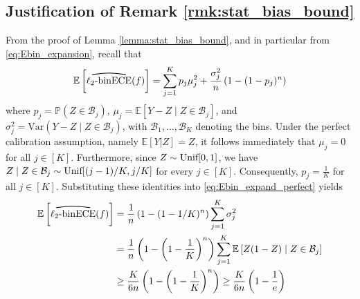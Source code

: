 \documentclass[11pt]{article}
\numberwithin{equation}{section}
\theoremstyle{definition}
\newcommand{\E}{\mathbb{E}}
\renewcommand{\P}{\mathbb{P}}
\newcommand{\cB}{\mathcal{B}}
\newcommand{\myoverline}[2][3.5em]{%
  \overset{%
    \tikz[baseline=-0.1ex]{
      \draw[line width=0.75pt]
        (0,0) .. controls (#1/2,0.5ex) .. (#1,0);
    }%
  }{#2}%
}
\newcommand{\Var}{\mathrm{Var}}
\newcommand{\binECE}{\mathrm{binECE}}
\newcommand{\lbinECE}{\ell_2\textnormal{-}\binECE}
\newcommand{\binhatECE}{\myoverline{\lbinECE}}
\begin{document}
\subsection{Justification of Remark \ref{rmk:stat_bias_bound}}\label{sec:e_binhat_O1}
From the proof of Lemma \ref{lemma:stat_bias_bound}, and in particular from \eqref{eq:Ebin_expansion}, recall that
\begin{align}\label{eq:Ebin_expand_perfect}
\E\left[\binhatECE(f)\right] = \sum_{j=1}^{K}p_j\mu_j^2 + \frac{\sigma_j^2}{n}\left(1-(1-p_j)^n\right)
\end{align}
where $p_j = \P(Z\in \cB_j)$, $\mu_j = \E[Y-Z\mid Z\in \cB_j]$, and $\sigma_j^2 = \Var(Y-Z\mid Z\in \cB_j)$, with $\cB_1,\ldots,\cB_K$ denoting the bins. Under the perfect calibration assumption, namely $\E[Y|Z] = Z$, it follows immediately that $\mu_j = 0$ for all $j\in [K]$. Furthermore, since $Z\sim \textnormal{Unif}[0,1]$, we have $Z\mid Z\in \cB_j\sim \textnormal{Unif}[(j-1)/K, j/K]$ for every $j\in [K]$. Consequently, $p_j = \frac{1}{K}$ for all $j\in[K]$. Substituting these identities into \eqref{eq:Ebin_expand_perfect} yields
\begin{align*}
\E\left[\binhatECE(f)\right]
& = \frac{1}{n}\left(1-(1-1/K)^n\right)\sum_{j=1}^{K}\sigma_j^2\\
& = \frac{1}{n}\left(1-\left(1-\frac{1}{K}\right)^n\right)\sum_{j=1}^{K}\E\left[Z(1-Z)\mid Z\in \cB_j\right]\\
& \geq \frac{K}{6n}\left(1-\left(1-\frac{1}{K}\right)^n\right)\geq \frac{K}{6n}\left(1-\frac{1}{e}\right)
\end{align*}
\end{document}
